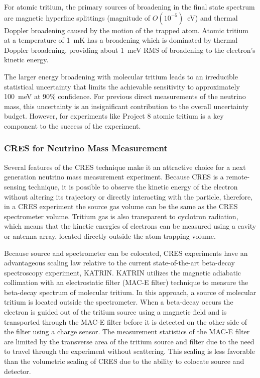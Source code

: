 For atomic tritium, the primary sources of broadening in the final state spectrum are magnetic hyperfine splittings (magnitude of $O(10^{-5})$~eV) and thermal Doppler broadening caused by the motion of the trapped atom. Atomic tritium at a temperature of 1~mK has a broadening which is dominated by thermal Doppler broadening, providing about 1~meV RMS of broadening to the electron's kinetic energy.

The larger energy broadening with molecular tritium leads to an irreducible statistical uncertainty that limits the achievable sensitivity to approximately 100~meV at 90\% confidence. For previous direct measurements of the neutrino mass, this uncertainty is an insignificant contribution to the overall uncertainty budget. However, for experiments like Project 8 atomic tritium is a key component to the success of the experiment.

\subsubsection*{CRES for Neutrino Mass Measurement}

Several features of the CRES technique make it an attractive choice for a next generation neutrino mass measurement experiment. Because CRES is a remote-sensing technique, it is possible to observe the kinetic energy of the electron without altering its trajectory or directly interacting with the particle, therefore, in a CRES experiment the source gas volume can be the same as the CRES spectrometer volume. Tritium gas is also transparent to cyclotron radiation, which means that the kinetic energies of electrons can be measured using a cavity or antenna array, located directly outside the atom trapping volume. 

Because source and spectrometer can be colocated, CRES experiments have an advantageous scaling law relative to the current state-of-the-art beta-decay spectroscopy experiment, KATRIN. KATRIN utilizes the magnetic adiabatic collimation with an electrostatic filter (MAC-E filter) technique to measure the beta-decay spectrum of molecular tritium. In this approach, a source of molecular tritium is located outside the spectrometer. When a beta-decay occurs the electron is guided out of the tritium source using a magnetic field and is transported through the MAC-E filter before it is detected on the other side of the filter using a charge sensor. The measurement statistics of the MAC-E filter are limited by the transverse area of the tritium source and filter due to the need to travel through the experiment without scattering. This scaling is less favorable than the volumetric scaling of CRES due to the ability to colocate source and detector.

